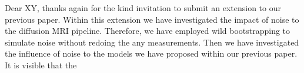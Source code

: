 \documentclass[a4paper]{article}
\begin{document}
Dear XY,
thanks again for the kind invitation to submit an extension to our previous
paper. Within this extension we have investigated the impact of noise
to the diffusion MRI pipeline. Therefore, we have employed wild bootstrapping to
simulate noise without redoing the any measurements. Then we have investigated
the influence of noise to the models we have proposed within our previous paper.
It is visible that the 
\end{document}
